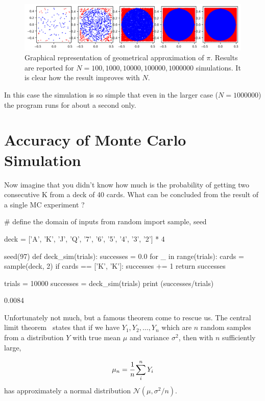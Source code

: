 \begin{figure}[htb]
\centering
\includegraphics[width=1\textwidth]{figures/mc_vs_n_experiments}
\caption{Graphical representation of geometrical approximation of $\pi$. Results are reported for $N = 100, 1000, 10000, 100000, 1000000$ simulations. It is clear how the result improves with $N$.}
\label{fig:circle_approx}
\end{figure}

In this case the simulation is so simple that even in the larger case ($N=1000000$) the program runs for about a second only.

\section{Accuracy of Monte Carlo Simulation}
\label{sec:confidence_interval}

Now imagine that you didn't know how much is the probability of getting two consecutive K from a deck of 40 cards. What can be concluded from the result of a single MC experiment ?
    
\begin{ipython}
# define the domain of inputs
from random import sample, seed

deck = ['A', 'K', 'J', 'Q', '7', '6', '5', '4', '3', '2'] * 4

seed(97)
def deck_sim(trials):
    successes = 0.0
    for _ in range(trials):
        cards = sample(deck, 2)
        if cards == ['K', 'K']:
            successes += 1
    return successes

trials = 10000
successes = deck_sim(trials)
print (successes/trials)
   \end{ipython}
\begin{ioutput}
0.0084
\end{ioutput}

Unfortunately not much, but a famous theorem come to rescue us.
The central limit theorem~\cite{bib:central_limit} states that if we have \(Y_1, Y_2,\dots, Y_n\) which are $n$ random samples from a distribution \(Y\) with true mean \(\mu\) and variance \(\sigma^{2}\), then with \(n\) sufficiently large,

\begin{equation*} 
\mu_n = \cfrac{1}{n}\sum_i^n Y_i
\end{equation*}
has approximately a normal distribution \(\mathcal{N}(\mu, \sigma^2/n)\).

